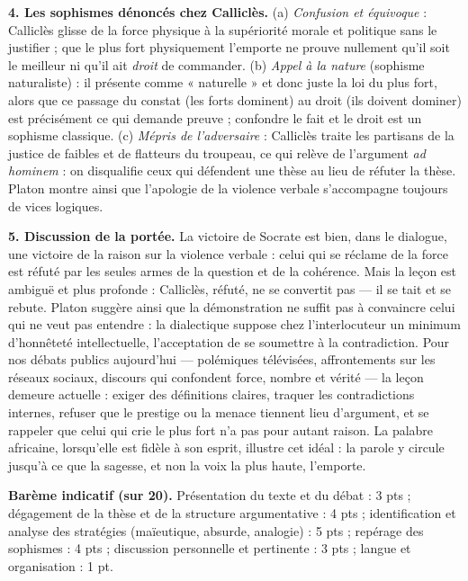 \documentclass[11pt]{article}
\begin{document}
\begin{corrige}
\textbf{4. Les sophismes dénoncés chez Calliclès.} (a) \emph{Confusion et équivoque} : Calliclès glisse de la force physique à la supériorité morale et politique sans le justifier ; que le plus fort physiquement l'emporte ne prouve nullement qu'il soit le meilleur ni qu'il ait \emph{droit} de commander. (b) \emph{Appel à la nature} (sophisme naturaliste) : il présente comme « naturelle » et donc juste la loi du plus fort, alors que ce passage du constat (les forts dominent) au droit (ils doivent dominer) est précisément ce qui demande preuve ; confondre le fait et le droit est un sophisme classique. (c) \emph{Mépris de l'adversaire} : Calliclès traite les partisans de la justice de faibles et de flatteurs du troupeau, ce qui relève de l'argument \emph{ad hominem} : on disqualifie ceux qui défendent une thèse au lieu de réfuter la thèse. Platon montre ainsi que l'apologie de la violence verbale s'accompagne toujours de vices logiques.

\textbf{5. Discussion de la portée.} La victoire de Socrate est bien, dans le dialogue, une victoire de la raison sur la violence verbale : celui qui se réclame de la force est réfuté par les seules armes de la question et de la cohérence. Mais la leçon est ambiguë et plus profonde : Calliclès, réfuté, ne se convertit pas --- il se tait et se rebute. Platon suggère ainsi que la démonstration ne suffit pas à convaincre celui qui ne veut pas entendre : la dialectique suppose chez l'interlocuteur un minimum d'honnêteté intellectuelle, l'acceptation de se soumettre à la contradiction. Pour nos débats publics aujourd'hui --- polémiques télévisées, affrontements sur les réseaux sociaux, discours qui confondent force, nombre et vérité --- la leçon demeure actuelle : exiger des définitions claires, traquer les contradictions internes, refuser que le prestige ou la menace tiennent lieu d'argument, et se rappeler que celui qui crie le plus fort n'a pas pour autant raison. La palabre africaine, lorsqu'elle est fidèle à son esprit, illustre cet idéal : la parole y circule jusqu'à ce que la sagesse, et non la voix la plus haute, l'emporte.

\textbf{Barème indicatif (sur 20).} Présentation du texte et du débat : 3 pts ; dégagement de la thèse et de la structure argumentative : 4 pts ; identification et analyse des stratégies (maïeutique, absurde, analogie) : 5 pts ; repérage des sophismes : 4 pts ; discussion personnelle et pertinente : 3 pts ; langue et organisation : 1 pt.


\end{corrige}
\end{document}
